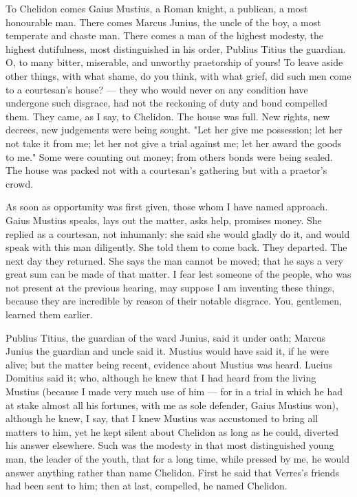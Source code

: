  To Chelidon comes Gaius Mustius, a Roman knight, a publican, a most honourable man. There comes Marcus Junius, the uncle of the boy, a most temperate and chaste man. There comes a man of the highest modesty, the highest dutifulness, most distinguished in his order, Publius Titius the guardian. O, to many bitter, miserable, and unworthy praetorship of yours! To leave aside other things, with what shame, do you think, with what grief, did such men come to a courtesan's house? --- they who would never on any condition have undergone such disgrace, had not the reckoning of duty and bond compelled them. They came, as I say, to Chelidon. The house was full. New rights, new decrees, new judgements were being sought. "Let her give me possession; let her not take it from me; let her not give a trial against me; let her award the goods to me." Some were counting out money; from others bonds were being sealed. The house was packed not with a courtesan's gathering but with a praetor's crowd.

 As soon as opportunity was first given, those whom I have named approach. Gaius Mustius speaks, lays out the matter, asks help, promises money. She replied as a courtesan, not inhumanly: she said she would gladly do it, and would speak with this man diligently. She told them to come back. They departed. The next day they returned. She says the man cannot be moved; that he says a very great sum can be made of that matter. I fear lest someone of the people, who was not present at the previous hearing, may suppose I am inventing these things, because they are incredible by reason of their notable disgrace. You, gentlemen, learned them earlier.

 Publius Titius, the guardian of the ward Junius, said it under oath; Marcus Junius the guardian and uncle said it. Mustius would have said it, if he were alive; but the matter being recent, evidence about Mustius was heard. Lucius Domitius said it; who, although he knew that I had heard from the living Mustius (because I made very much use of him --- for in a trial in which he had at stake almost all his fortunes, with me as sole defender, Gaius Mustius won), although he knew, I say, that I knew Mustius was accustomed to bring all matters to him, yet he kept silent about Chelidon as long as he could, diverted his answer elsewhere. Such was the modesty in that most distinguished young man, the leader of the youth, that for a long time, while pressed by me, he would answer anything rather than name Chelidon. First he said that Verres's friends had been sent to him; then at last, compelled, he named Chelidon.

